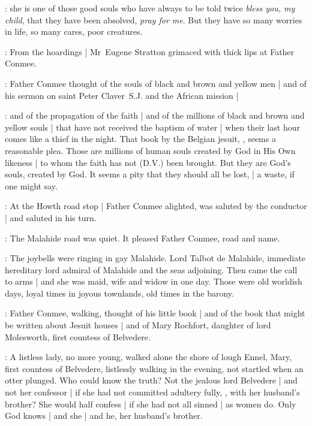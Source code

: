 \conmeeint:
she is one of those good souls who have always to be told twice
\emph{bless you, my child},
that they have been absolved,
\emph{pray for me}.
But they have so many worries in life,%
so many cares, poor creatures.

:
From the hoardings |
Mr~Eugene Stratton grimaced with thick %
lips at Father Conmee.

:
Father Conmee thought of the souls of black and brown and yellow men |
and of his sermon on saint Peter Claver~S.J. and the African mission |

\conmeeint:
and of the propagation of the faith |
and of the millions of black and brown and yellow souls |
that have not received the baptism of water |
when their last hour comes like a thief in the night.
That book by the Belgian jesuit,
,
seems a reasonable plea.
Those are millions of human souls created by God in His Own likeness |
to whom the faith has not (D.V.) been brought.%
But they are God's souls, created by God.
It seems a pity that they should all be lost, |
a waste, if one might say.

:
At the Howth road stop |
Father Conmee alighted,
was saluted by the conductor |
and saluted in his turn.

:
The Malahide road was quiet.
It pleased Father Conmee, road and name.

\conmeeint:
The joybells were ringing in gay Malahide.
Lord Talbot de Malahide,
immediate hereditary lord admiral of Malahide and the seas adjoining.
Then came the call to arms |
and she was maid, wife and widow in one day.
Those were old worldish days,
loyal times in joyous townlands,
old times in the barony.%

:
Father Conmee, walking, thought of his little book
 |
and of the book that might be written about Jesuit houses |
and of Mary Rochfort,
daughter of lord Molesworth,
first countess of Belvedere.

\conmeeint:
A listless lady, no more young,
walked alone the shore of lough Ennel,
Mary, first countess of Belvedere,
listlessly walking in the evening,
not startled when an otter plunged.
Who could know the truth?
Not the jealous lord Belvedere |
and not her confessor |
if she had not committed adultery fully,
,
with her husband's brother?
She would half confess |
if she had not all sinned |
as women do.%
Only God knows |
and she |
and he, her husband's brother.

